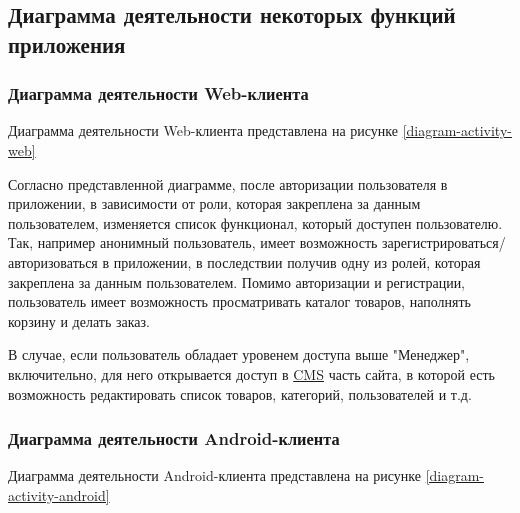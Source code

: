 \subsection{Диаграмма деятельности некоторых функций приложения}\label{subsec:2-activity-diagram}\indent


\subsubsection{Диаграмма деятельности Web-клиента}\indent

Диаграмма деятельности Web-клиента представлена на рисунке \ref{diagram-activity-web}

Согласно представленной диаграмме, после авторизации пользователя в приложении, в зависимости от роли, которая закреплена за данным пользователем, изменяется список функционал, который доступен пользователю.
Так, например анонимный пользователь, имеет возможность зарегистрироваться/авторизоваться в приложении, в последствии получив одну из ролей, которая закреплена за данным пользователем.
Помимо авторизации и регистрации, пользователь имеет возможность просматривать каталог товаров, наполнять корзину и делать заказ.

В случае, если пользователь обладает уровенем доступа выше "Менеджер", включительно, для него открывается доступ в \hyperlink{gloss:cms}{CMS} часть сайта, в которой есть возможность редактировать список товаров, категорий, пользователей и т.д.


\subsubsection{Диаграмма деятельности Android-клиента}\indent

Диаграмма деятельности Android-клиента представлена на рисунке \ref{diagram-activity-android}
\break